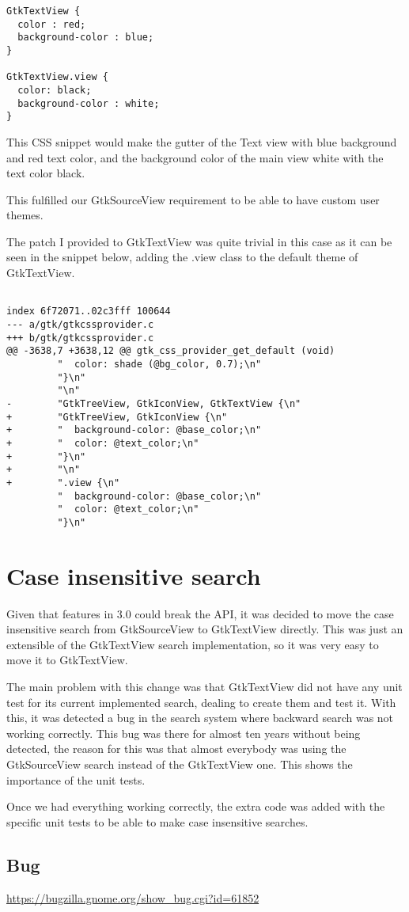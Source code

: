 \begin{lstlisting}[style=plain]
GtkTextView {
  color : red;
  background-color : blue;
}

GtkTextView.view {
  color: black;
  background-color : white;
}
\end{lstlisting}

This CSS snippet would make the gutter of the Text view with blue background and red text color, and the background color of the 
main view white with the text color black.

This fulfilled our GtkSourceView requirement to be able to have custom user themes.

The patch I provided to GtkTextView was quite trivial in this case as it can be seen in the snippet below, adding the .view class to the default theme of GtkTextView.

\begin{lstlisting}[style=plain]

index 6f72071..02c3fff 100644
--- a/gtk/gtkcssprovider.c
+++ b/gtk/gtkcssprovider.c
@@ -3638,7 +3638,12 @@ gtk_css_provider_get_default (void)
         "  color: shade (@bg_color, 0.7);\n"
         "}\n"
         "\n"
-        "GtkTreeView, GtkIconView, GtkTextView {\n"
+        "GtkTreeView, GtkIconView {\n"
+        "  background-color: @base_color;\n"
+        "  color: @text_color;\n"
+        "}\n"
+        "\n"
+        ".view {\n"
         "  background-color: @base_color;\n"
         "  color: @text_color;\n"
         "}\n"

\end{lstlisting}

\newpage
\section{Case insensitive search}

Given that features in 3.0 could break the API, it was decided to move the case insensitive search from GtkSourceView 
to GtkTextView directly. This was just an extensible of the GtkTextView search implementation, so it was very easy to move it to GtkTextView.

The main problem with this change  was that GtkTextView did not have any unit test for its current implemented search, 
dealing to create them and test it.   With this, it was detected a bug in the search system where backward search was 
not working correctly. This bug was there for almost ten years without being detected, the reason for this was that 
almost everybody was using the GtkSourceView search instead of the GtkTextView one. This shows the importance of the unit tests.

Once we had everything working correctly, the extra code was added with the specific unit tests to be able to make 
case insensitive searches.

\subsection{Bug}

\noindent\url{https://bugzilla.gnome.org/show_bug.cgi?id=61852}
